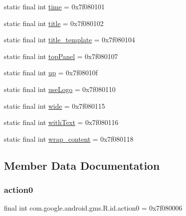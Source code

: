 \begin{DoxyCompactItemize}
\item 
static final int \mbox{\hyperlink{classcom_1_1google_1_1android_1_1gms_1_1R_1_1id_aba134fd0555996d992179c9812fe083a}{time}} = 0x7f080101
\item 
static final int \mbox{\hyperlink{classcom_1_1google_1_1android_1_1gms_1_1R_1_1id_a057da1bfcc1696938aa8d97586d83324}{title}} = 0x7f080102
\item 
static final int \mbox{\hyperlink{classcom_1_1google_1_1android_1_1gms_1_1R_1_1id_a34fbb262d201f09bb47feb8459ee1e2d}{title\+\_\+template}} = 0x7f080104
\item 
static final int \mbox{\hyperlink{classcom_1_1google_1_1android_1_1gms_1_1R_1_1id_a834f2cc8e51383d40a3460a255b88d7c}{top\+Panel}} = 0x7f080107
\item 
static final int \mbox{\hyperlink{classcom_1_1google_1_1android_1_1gms_1_1R_1_1id_afe100dfca845e9a886cdd942bf03a48a}{up}} = 0x7f08010f
\item 
static final int \mbox{\hyperlink{classcom_1_1google_1_1android_1_1gms_1_1R_1_1id_a2b1a67da6c2c28c614bf3f3d9f06d883}{use\+Logo}} = 0x7f080110
\item 
static final int \mbox{\hyperlink{classcom_1_1google_1_1android_1_1gms_1_1R_1_1id_a0e505f77966dac9fd171b9d89e2b06bb}{wide}} = 0x7f080115
\item 
static final int \mbox{\hyperlink{classcom_1_1google_1_1android_1_1gms_1_1R_1_1id_a7cccfae6062d475ee8b762b8f17ec98c}{with\+Text}} = 0x7f080116
\item 
static final int \mbox{\hyperlink{classcom_1_1google_1_1android_1_1gms_1_1R_1_1id_a9c481e9a4edb193c3fa1ccf7a207889d}{wrap\+\_\+content}} = 0x7f080118
\end{DoxyCompactItemize}


\subsection{Member Data Documentation}
\mbox{\label{classcom_1_1google_1_1android_1_1gms_1_1R_1_1id_ae54bd3ac7a3cb599ed4ae2bf9ca54221}} 
\subsubsection{\texorpdfstring{action0}{action0}}
{\footnotesize\ttfamily final int com.\+google.\+android.\+gms.\+R.\+id.\+action0 = 0x7f080006\hspace{0.3cm}{\ttfamily [static]}}

